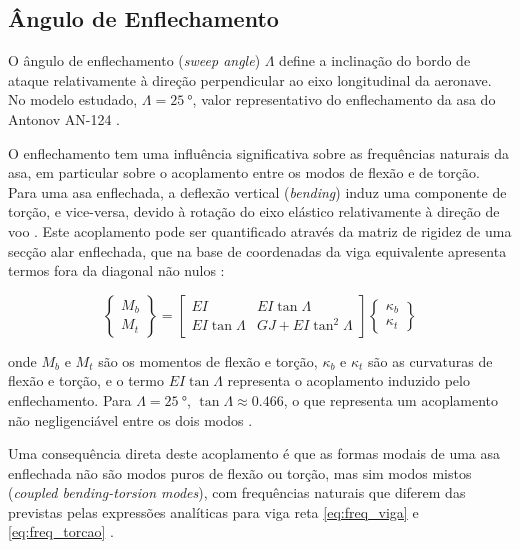 \documentclass[11pt,twoside,a4paper]{report}
\begin{document}
\subsection{Ângulo de Enflechamento}

O ângulo de enflechamento (\textit{sweep angle}) $\Lambda$ define a inclinação do bordo de ataque relativamente à direção perpendicular ao eixo longitudinal da aeronave. No modelo estudado, $\Lambda = \qty{25}{\degree}$, valor representativo do enflechamento da asa do Antonov AN-124 \cite{Antonov2004}.

O enflechamento tem uma influência significativa sobre as frequências naturais da asa, em particular sobre o acoplamento entre os modos de flexão e de torção. Para uma asa enflechada, a deflexão vertical (\textit{bending}) induz uma componente de torção, e vice-versa, devido à rotação do eixo elástico relativamente à direção de voo \cite{Dowell2004}. Este acoplamento pode ser quantificado através da matriz de rigidez de uma secção alar enflechada, que na base de coordenadas da viga equivalente apresenta termos fora da diagonal não nulos \cite{Hodges2011}:

\begin{equation}
    \begin{Bmatrix} M_b \\ M_t \end{Bmatrix} =
    \begin{bmatrix} 
        EI & EI\tan\Lambda \\ 
        EI\tan\Lambda & GJ + EI\tan^2\Lambda 
    \end{bmatrix}
    \begin{Bmatrix} \kappa_b \\ \kappa_t 
    \end{Bmatrix}
    \label{eq:rigidez_enflechamento}
\end{equation}

\noindent onde $M_b$ e $M_t$ são os momentos de flexão e torção, $\kappa_b$ e $\kappa_t$ são as curvaturas de flexão e torção, e o termo $EI\tan\Lambda$ representa o acoplamento induzido pelo enflechamento. Para $\Lambda = \qty{25}{\degree}$, $\tan\Lambda \approx 0.466$, o que representa um acoplamento não negligenciável entre os dois modos \cite{Bisplinghoff1996}.

Uma consequência direta deste acoplamento é que as formas modais de uma asa enflechada não são modos puros de flexão ou torção, mas sim modos mistos (\textit{coupled bending-torsion modes}), com frequências naturais que diferem das previstas pelas expressões analíticas para viga reta \eqref{eq:freq_viga} e \eqref{eq:freq_torcao} \cite{Wright2015}.
\end{document}
